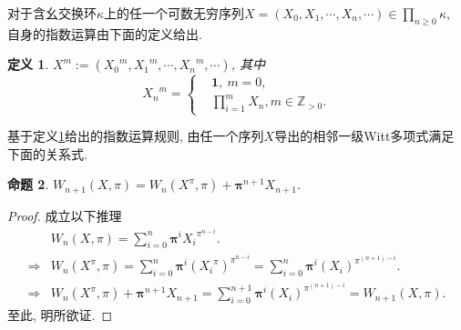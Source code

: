 \documentclass[UTF8, twoside]{ctexart}
\theoremstyle{nonumberplain}
\newtheorem{proof}{\heiti 证明}  %
\theoremstyle{nonumberplain}
\theoremstyle{plain}
\newtheorem{dingyi}{定义}[subsection]
\newtheorem{mingti}[dingyi]{命题}
\begin{document}
	对于含幺交换环$\kappa $上的任一个可数无穷序列$X=\left( {{X}_{0}},{{X}_{1}},\cdots ,{{X}_{n}},\cdots  \right)\in \prod_{n\ge 0}^{{}}{\kappa }$, 自身的指数运算由下面的定义给出.
	\begin{dingyi} \label{Witt向量指数运算}		
		${{X}^{m}}:=\left( {{X}_{0}}^{m},{{X}_{1}}^{m},\cdots ,{{X}_{n}}^{m},\cdots  \right)$, 其中
		\[
			{{X}_{n}}^{m}=\left\{ \begin{aligned}
				& \bm{1},\ m=0, \\ 
				& \prod\limits_{i=1}^{m}{{{X}_{n}}},
				m\in {{\mathbb{Z}}_{>0}}.
			\end{aligned} \right.
		\]
	\end{dingyi}
	\vskip 0.5cm
	
	基于定义\ref{Witt向量指数运算}给出的指数运算规则, 由任一个序列$X$导出的相邻一级Witt多项式满足下面的关系式.
	\begin{mingti} \label{Witt迭代式命题}
		${{W}_{n+1}}\left( X,\pi  \right)={{W}_{n}}\left( {{X}^{\pi }},\pi  \right)+{\bm{\pi }^{n+1}}{{X}_{n+1}}$.
	\end{mingti}
	\begin{proof}
		成立以下推理
		\begin{align*}
			& {{W}_{n}}\left( X,\pi  \right)=\sum\limits_{i=0}^{n}{{\bm{\pi }^{i}}{{X}_{i}}^{{{\pi }^{n-i}}}}. \\ 
			\Longrightarrow& {{W}_{n}}\left( {{X}^{\pi }},\pi  \right)=\sum\limits_{i=0}^{n}{{\bm{\pi }^{i}}{{\left( {{X}_{i}}^{\pi } \right)}^{{{\pi }^{n-i}}}}}=\sum\limits_{i=0}^{n}{{\bm{\pi }^{i}}{{\left( {{X}_{i}} \right)}^{{{\pi }^{\left( n+1 \right)-i}}}}}. \\ 
			\Longrightarrow& {{W}_{n}}\left( {{X}^{\pi }},\pi  \right)+{\bm{\pi }^{n+1}}{{X}_{n+1}}=\sum\limits_{i=0}^{n+1}{{\bm{\pi }^{i}}{{\left( {{X}_{i}} \right)}^{{{\pi }^{\left( n+1 \right)-i}}}}}={{W}_{n+1}}\left( X,\pi  \right).
		\end{align*}
		至此, 明所欲证.
	\end{proof}
	\vskip 0.5cm
	
\end{document}
